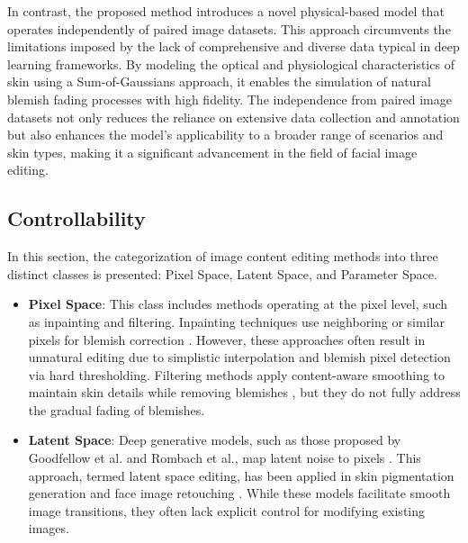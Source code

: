 \begin{spacing}{1.5}
In contrast, the proposed method introduces a novel physical-based model that operates independently of paired image datasets. This approach circumvents the limitations imposed by the lack of comprehensive and diverse data typical in deep learning frameworks. By modeling the optical and physiological characteristics of skin using a Sum-of-Gaussians approach, it enables the simulation of natural blemish fading processes with high fidelity. The independence from paired image datasets not only reduces the reliance on extensive data collection and annotation but also enhances the model's applicability to a broader range of scenarios and skin types, making it a significant advancement in the field of facial image editing.

\subsection{Controllability}
In this section, the categorization of image content editing methods into three distinct classes is presented: Pixel Space, Latent Space, and Parameter Space.

\begin{itemize}
    \item \textbf{Pixel Space}: This class includes methods operating at the pixel level, such as inpainting and filtering. Inpainting techniques use neighboring or similar pixels for blemish correction \cite{bertalmio2001navier, lipowezkyAutomaticFrecklesDetection2008, Liu2017AutomaticFF}. However, these approaches often result in unnatural editing due to simplistic interpolation and blemish pixel detection via hard thresholding. Filtering methods apply content-aware smoothing to maintain skin details while removing blemishes \cite{velusamyFabSoftenFaceBeautification2020, heGuidedImageFiltering2010}, but they do not fully address the gradual fading of blemishes.

    \item \textbf{Latent Space}: Deep generative models, such as those proposed by Goodfellow et al. and Rombach et al., map latent noise to pixels \cite{goodfellowGenerativeAdversarialNetworks2014,rombach2021highresolution}. This approach, termed latent space editing, has been applied in skin pigmentation generation and face image retouching \cite{beharaSkinLesionSynthesis2023, xieBlemishawareProgressiveFace2023, liuAutomaticBeautificationGroupPhoto2018}. While these models facilitate smooth image transitions, they often lack explicit control for modifying existing images.


\end{itemize}
\end{spacing}
